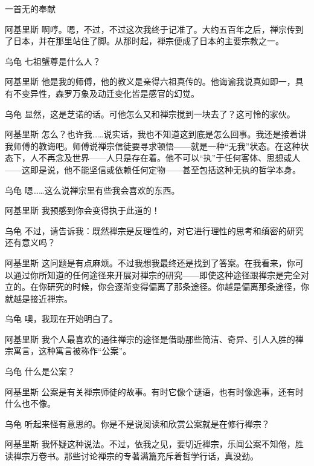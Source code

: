 \begin{dialog}{一首无的奉献\label{abcd}}
\begin{dialogue}
\item[阿基里斯]啊哼。嗯，不过，不过这次我终于记准了。大约五百年之后，禅宗传到了日本，并在那里站住了脚。从那时起，禅宗便成了日本的主要宗教之一。

\item[乌龟]七祖蟹尊是什么人？

\item[阿基里斯]他是我的师傅，他的教义是亲得六祖真传的。他诲谕我说真如即一，具有不变异性，森罗万象及动迁变化皆是感官的幻觉。

\item[乌龟]显然，这是芝诺的话。可他怎么又和禅宗搅到一块去了？这可怜的家伙。

\item[阿基里斯]怎么？也许我……说实话，我也不知道这到底是怎么回事。我还是接着讲我师傅的教诲吧。师傅说禅宗信徒要寻求顿悟——就是一种“无我”状态。在这种状态下，人不再念及世界——人只是存在着。他不可以“执”于任何客体、思想或人——这即是说，他不能坚信或依赖任何定物——甚至包括这种无执的哲学本身。

\item[乌龟]嗯……这么说禅宗里有些我会喜欢的东西。

\item[阿基里斯]我预感到你会变得执于此道的！

\item[乌龟]不过，请告诉我：既然禅宗是反理性的，对它进行理性的思考和缜密的研究还有意义吗？

\item[阿基里斯]这问题是有点麻烦。不过我想我最终还是找到了答案。在我看来，你可以通过你所知道的任何途径来开展对禅宗的研究——即使这种途径跟禅宗是完全对立的。在你研究的时候，你会逐渐变得偏离了那条途径。你越是偏离那条途径，你就越是接近禅宗。

\item[乌龟]噢，我现在开始明白了。

\item[阿基里斯]我个人最喜欢的通往禅宗的途径是借助那些简洁、奇异、引人入胜的禅宗寓言，这种寓言被称作“公案”。

\item[乌龟]什么是公案？

\item[阿基里斯]公案是有关禅宗师徒的故事。有时它像个谜语，也有时像逸事，还有时什么也不像。

\item[乌龟]听起来怪有意思的。你是不是说阅读和欣赏公案就是在修行禅宗？

\item[阿基里斯]我怀疑这种说法。不过，依我之见，要切近禅宗，乐闻公案不知倦，胜读禅宗万卷书。那些讨论禅宗的专著满篇充斥着哲学行话，真没劲。


\end{dialogue}
\end{dialog}
